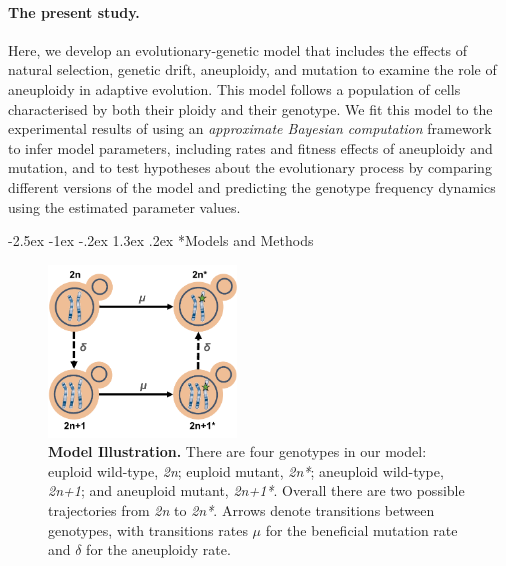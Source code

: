 \documentclass[12pt]{extarticle}
\makeatletter
\renewcommand\section{\@startsection {section}{1}{\z@}%
     {-2.5ex \@plus -1ex \@minus -.2ex}%
     {1.3ex \@plus.2ex}%
    {\Large\bfseries}}
\newcommand{\euwt}{\emph{2n}}
\newcommand{\anwt}{\emph{2n+1}}
\newcommand{\eumt}{\emph{2n*}}
\newcommand{\anmt}{\emph{2n+1*}}
\makeatother
\begin{document}
\paragraph*{The present study.}
Here, we develop an evolutionary-genetic model that includes the effects of natural selection, genetic drift, aneuploidy, and mutation to examine the role of aneuploidy in adaptive evolution.
This model follows a population of cells characterised by both their ploidy and their genotype.
We fit this model to the experimental results of \citet{Yona2012} using an \emph{approximate Bayesian computation} framework~\citep{Sisson2009} to infer model parameters, including rates and fitness effects of aneuploidy and mutation, and to test hypotheses about the evolutionary process by comparing different versions of the model and predicting the genotype frequency dynamics using the estimated parameter values.



\section*{Models and Methods}

\begin{figure}[b!]
  \centering
    \includegraphics[height=1.8in]{../figures/Fig1-A.pdf}      
  \caption{
    \textbf{Model Illustration.}
    There are four genotypes in our model: euploid wild-type, \euwt; euploid mutant, \eumt; aneuploid wild-type, \anwt; and aneuploid mutant, \anmt.
    Overall there are two possible trajectories from \euwt\; to \eumt.
    Arrows denote transitions between genotypes, with transitions rates $\mu$ for the beneficial mutation rate and $\delta$ for the aneuploidy rate.
   }
  \label{fig:models}
\end{figure}



\end{document}
